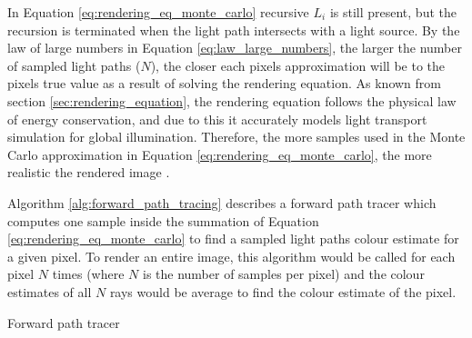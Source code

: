 \documentclass[ %
                    author={Callum Pearce},
                supervisor={Dr. Neill Campbell},
                    degree={MEng},
                     title={How effective are Temporal difference learning methods for reducing the number of zero contribution light paths while still accurately approximating Global Illumination in Path tracing?},
                  subtitle={},
                      type={research},
                      year={2019} ]{dissertation}
\begin{document}
In Equation \ref{eq:rendering_eq_monte_carlo} recursive $L_i$ is still present, but the recursion is terminated when the light path intersects with a light source. By the law of large numbers in Equation \ref{eq:law_large_numbers}, the larger the number of sampled light paths ($N$), the closer each pixels approximation will be to the pixels true value as a result of solving the rendering equation. As known from section \ref{sec:rendering_equation}, the rendering equation follows the physical law of energy conservation, and due to this it accurately models light transport simulation for global illumination. Therefore, the more samples used in the Monte Carlo approximation in Equation \ref{eq:rendering_eq_monte_carlo}, the more realistic the rendered image \cite{christensen2016path}.


Algorithm \ref{alg:forward_path_tracing} describes a forward path tracer which computes one sample inside the summation of Equation \ref{eq:rendering_eq_monte_carlo} to find a sampled light paths colour estimate for a given pixel. To render an entire image, this algorithm would be called for each pixel $N$ times (where $N$ is the number of samples per pixel) and the colour estimates of all $N$ rays would be average to find the colour estimate of the pixel.\\

\begin{algorithm}[H]
\label{alg:forward_path_tracing}
\SetAlgoLined
 \caption{Forward path tracer}
\end{algorithm}
\end{document}
